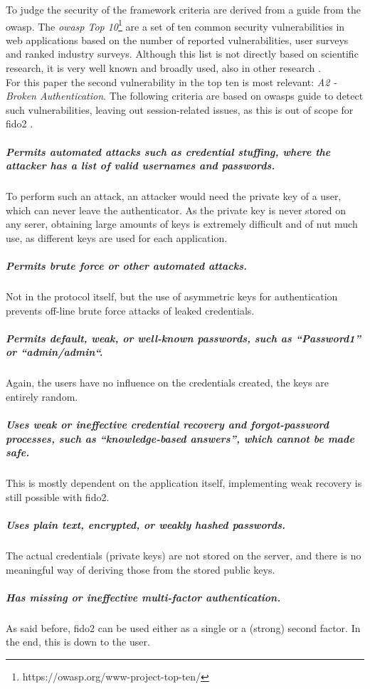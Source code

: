 To judge the security of the framework criteria are derived from a guide from the \ac{owasp}. The \emph{\ac{owasp} Top 10}\footnote{https://owasp.org/www-project-top-ten/} are a set of ten common security vulnerabilities in web applications based on the number of reported vulnerabilities, user surveys and ranked industry surveys. Although this list is not directly based on scientific research, it is very well known and broadly used, also in other research \cite{rafique2015}.\\
For this paper the second vulnerability in the top ten is most relevant: \emph{A2 - Broken Authentication}. The following criteria are based on \acp{owasp} guide to detect such vulnerabilities, leaving out session-related issues, as this is out of scope for \ac{fido2} \cite{owasp_auth}.

\subparagraph{Permits automated attacks such as credential stuffing, where the attacker has a list of valid usernames and passwords.} To perform such an attack, an attacker would need the private key of a user, which can never leave the authenticator. As the private key is never stored on any serer, obtaining large amounts of keys is extremely difficult and of nut much use, as different keys are used for each application.

\subparagraph{Permits brute force or other automated attacks.} Not in the protocol itself, but the use of asymmetric keys for authentication prevents off-line brute force attacks of leaked credentials.

\subparagraph{Permits default, weak, or well-known passwords, such as “Password1” or “admin/admin“.} Again, the users have no influence on the credentials created, the keys are entirely random.

\subparagraph{Uses weak or ineffective credential recovery and forgot-password processes, such as “knowledge-based answers”, which cannot be made safe.} This is mostly dependent on the application itself, implementing weak recovery is still possible with \ac{fido2}.

\subparagraph{Uses plain text, encrypted, or weakly hashed passwords.} The actual credentials (private keys) are not stored on the server, and there is no meaningful way of deriving those from the stored public keys.

\subparagraph{Has missing or ineffective multi-factor authentication.} As said before, \ac{fido2} can be used either as a single or a (strong) second factor. In the end, this is down to the user.

